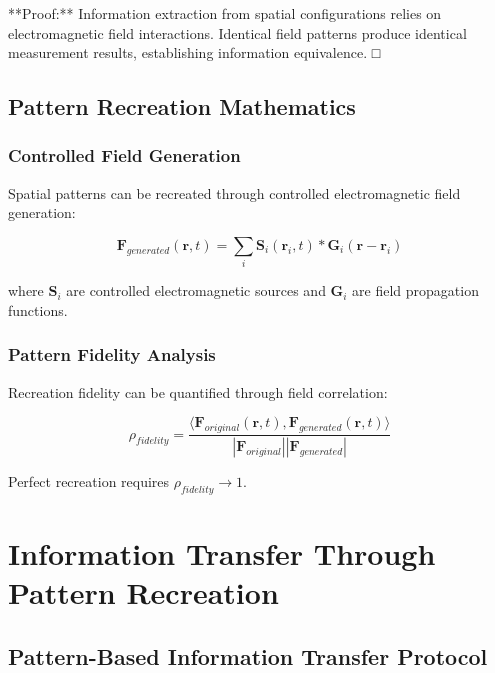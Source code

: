 \documentclass[12pt,a4paper]{article}
\begin{document}
**Proof:** Information extraction from spatial configurations relies on electromagnetic field interactions. Identical field patterns produce identical measurement results, establishing information equivalence. □

\subsection{Pattern Recreation Mathematics}

\subsubsection{Controlled Field Generation}

Spatial patterns can be recreated through controlled electromagnetic field generation:

\begin{equation}
\mathbf{F}_{generated}(\mathbf{r}, t) = \sum_i \mathbf{S}_i(\mathbf{r}_i, t) \ast \mathbf{G}_i(\mathbf{r} - \mathbf{r}_i)
\label{eq:controlled_field_generation}
\end{equation}

where $\mathbf{S}_i$ are controlled electromagnetic sources and $\mathbf{G}_i$ are field propagation functions.

\subsubsection{Pattern Fidelity Analysis}

Recreation fidelity can be quantified through field correlation:

\begin{equation}
\rho_{fidelity} = \frac{\langle \mathbf{F}_{original}(\mathbf{r}, t), \mathbf{F}_{generated}(\mathbf{r}, t) \rangle}{|\mathbf{F}_{original}||\mathbf{F}_{generated}|}
\label{eq:pattern_fidelity}
\end{equation}

Perfect recreation requires $\rho_{fidelity} \rightarrow 1$.

\section{Information Transfer Through Pattern Recreation}

\subsection{Pattern-Based Information Transfer Protocol}
\end{document}
